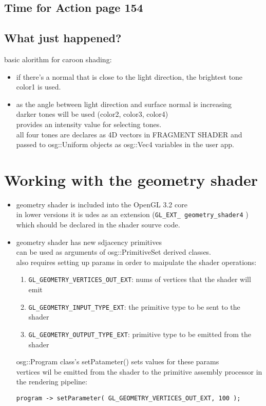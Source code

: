\documentclass[a4paper,12pt]{book}
\begin{document}
\subsection{Time for Action page 154}
\subsection{What just happened?}
basic alorithm for caroon shading:
\begin{itemize}
\item if there's a normal that is close to the light direction, the brightest tone\\ \textrightarrow color1 is used.
\item as the angle between light direction and surface normal is increasing\\
 \textrightarrow darker tones will be used (color2, color3, color4)\\
\textrightarrow provides an intensity value for selecting tones.\\
\textrightarrow all four tones are declares as 4D vectors in FRAGMENT SHADER and passed to osg::Uniform objects as osg::Vec4 variables in the user app.
\end{itemize}

\section{Working with the geometry shader}
\begin{itemize}
\item geometry shader is included into the OpenGL 3.2 core\\
\textrightarrow in lower versions it is udes as an extension (\verb|GL_EXT_ geometry_shader4| ) which should be declared in the shader sourve code.
\item geometry shader has new sdjacency primitives\\
\textrightarrow can be used as arguments of osg::PrimitiveSet derived classes.\\
\textrightarrow also requires setting up params in order to maipulate the shader operations:

\begin{enumerate}
\item \verb|GL_GEOMETRY_VERTICES_OUT_EXT|: nums of vertices that the shader will emit
\item \verb|GL_GEOMETRY_INPUT_TYPE_EXT|: the primitive type to be sent to the shader
\item \verb|GL_GEOMETRY_OUTPUT_TYPE_EXT|: primitive type to be emitted from the shader
\end{enumerate}
\textrightarrow osg::Program class's setPatameter() sets values for these params\\
 vertices wil be emitted from the shader to the primitive assembly processor in the rendering pipeline:
\begin{lstlisting}
program -> setParameter( GL_GEOMETRY_VERTICES_OUT_EXT, 100 );
\end{lstlisting}
\end{itemize}
\end{document}
